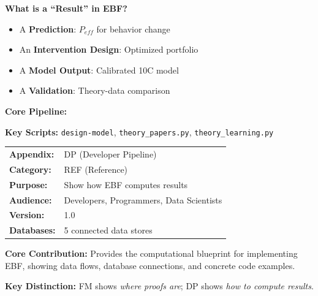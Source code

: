 \begin{tcolorbox}[colback=yellow!10!white, colframe=orange!75!black,
    title=\textbf{Quick Reference: Developer Pipeline}]

\textbf{What is a ``Result'' in EBF?}
\begin{itemize}[nosep]
    \item A \textbf{Prediction}: $P_{eff}$ for behavior change
    \item An \textbf{Intervention Design}: Optimized portfolio
    \item A \textbf{Model Output}: Calibrated 10C model
    \item A \textbf{Validation}: Theory-data comparison
\end{itemize}

\textbf{Core Pipeline:}
\begin{center}
\end{center}

\textbf{Key Scripts:}
\texttt{design-model}, \texttt{theory\_papers.py}, \texttt{theory\_learning.py}

\end{tcolorbox}

\begin{tcolorbox}[colback=blue!5!white, colframe=blue!75!black,
    title=\textbf{Appendix UNMAPPED_DP: REF-DEVPIPE}]

\begin{tabular}{@{}ll@{}}
\textbf{Appendix:} & DP (Developer Pipeline) \\
\textbf{Category:} & REF (Reference) \\
\textbf{Purpose:} & Show how EBF computes results \\
\textbf{Audience:} & Developers, Programmers, Data Scientists \\
\textbf{Version:} & 1.0 \\
\textbf{Databases:} & 5 connected data stores \\
\end{tabular}

\tcblower

\textbf{Core Contribution:} Provides the computational blueprint for
implementing EBF, showing data flows, database connections, and concrete
code examples.

\textbf{Key Distinction:} FM shows \textit{where proofs are};
DP shows \textit{how to compute results}.

\end{tcolorbox}

